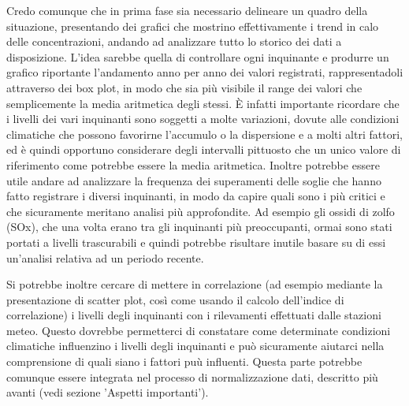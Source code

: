 \documentclass{article}
\begin{document}
Credo comunque che in prima fase sia necessario delineare un quadro della situazione, presentando dei grafici che mostrino effettivamente i trend in calo delle concentrazioni, andando ad analizzare tutto lo storico dei dati a disposizione. L'idea sarebbe quella di controllare ogni inquinante e produrre un grafico riportante l'andamento anno per anno dei valori registrati, rappresentadoli attraverso dei box plot, in modo che sia più visibile il range dei valori che semplicemente la media aritmetica degli stessi. È infatti importante ricordare che i livelli dei vari inquinanti sono soggetti a molte variazioni, dovute alle condizioni climatiche che possono favorirne l'accumulo o la dispersione e a molti altri fattori, ed è quindi opportuno considerare degli intervalli pittuosto che un unico valore di riferimento come potrebbe essere la media aritmetica.
Inoltre potrebbe essere utile andare ad analizzare la frequenza dei superamenti delle soglie che hanno fatto registrare i diversi inquinanti, in modo da capire quali sono i più critici e che sicuramente meritano analisi più approfondite. Ad esempio gli ossidi di zolfo (SOx), che una volta erano tra gli inquinanti più preoccupanti, ormai sono stati portati a livelli trascurabili e quindi potrebbe risultare inutile basare su di essi un'analisi relativa ad un periodo recente.

Si potrebbe inoltre cercare di mettere in correlazione (ad esempio mediante la presentazione di scatter plot, così come usando il calcolo dell'indice di correlazione) i livelli degli inquinanti con i rilevamenti effettuati dalle stazioni meteo. Questo dovrebbe permetterci di constatare come determinate condizioni climatiche influenzino i livelli degli inquinanti e può sicuramente aiutarci nella comprensione di quali siano i fattori puù influenti. Questa parte potrebbe comunque essere integrata nel processo di normalizzazione dati, descritto più avanti (vedi sezione 'Aspetti importanti').
\end{document}
